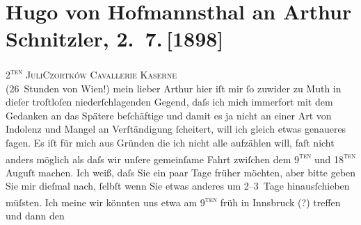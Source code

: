 

         
         \renewcommand{\erwaehntePersonen}{Personen: Hugo von Hofmannsthal}
         \renewcommand{\erwaehnteOrte}{Orte: Basel, Innsbruck, Maloja, Schweiz, Tschortkiw, Wien}
         \renewcommand{\erwaehnteWerke}{}
               \section[Hugo von Hofmannsthal an Arthur Schnitzler, 2. 7. {[}1898{]}]{ Hugo von Hofmannsthal an Arthur Schnitzler, 2. 7. {[}1898{]}}\nopagebreak{}\rehead{ }\begin{ledgroupsized}[t]{13cm}\normalsize\beginnumbering \toendnotes[C]{\smallbreak\pagebreak[2]} 
\pstart
           {\pb}\textsc{2\textsuperscript{ten} Juli}\hfill \textsc{Czortków}\pend
           \pstart
           \raggedleft{}\textsc{Cavallerie Kaserne}{\\} (26 Stunden von Wien!)\pend
           \pstart{}mein lieber Arthur\pend\pstart
           hier iſt mir ſo zuwider zu Muth in dieſer troſtloſen niederſchlagenden Gegend, daſs
               ich mich immerfort mit dem Gedanken an das Spätere beſchäftige und damit es ja nicht
               an einer Art von Indolenz und Mangel an Verſtändigung ſcheitert, will ich gleich
               etwas genaueres ſagen. Es iſt {\pb}für
               mich aus Gründen die ich nicht alle aufzählen will, faſt nicht anders möglich als
               daſs wir unſere gemeinſame Fahrt zwiſchen dem 9\textsc{\textsuperscript{ten}} und 18\textsc{\textsuperscript{ten}} Auguſt machen. Ich weiß, daſs Sie ein paar Tage früher möchten, aber
               bitte geben Sie mir dieſmal {\pb}nach,
               ſelbſt wenn Sie etwas anderes um 2–3 Tage hinausſchieben müſsten. Ich meine wir
               könnten uns etwa am 9\textsc{\textsuperscript{ten}} früh in Innsbruck (?) treffen und dann den

\end{ledgroupsized}
